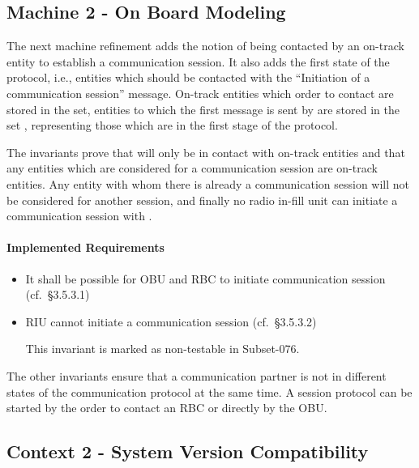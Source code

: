 \documentclass{template/openetcs_article}
\begin{document}
%

\subsection{Machine 2 - On Board Modeling}
\label{sec:machine-2-board}

The next machine refinement adds the notion of being contacted by an on-track
entity to establish a communication session. It also adds the first state of the
protocol, i.e., entities which should be contacted with the ``Initiation of a
communication session'' message. On-track entities which order 
to contact are stored in the  set, entities to which the
first message is sent by  are stored in the set
, representing those which are in the first stage of the
protocol.

The invariants prove that  will only be in contact with
on-track entities and that any entities which are considered for a communication
session are on-track entities. Any entity with whom there is already a
communication session will not be considered for another session, and finally no
radio in-fill unit can initiate a communication session with .

\paragraph{Implemented Requirements}
\label{sec:impl-requ-1}

\begin{itemize}
\item It shall be possible for OBU and RBC to initiate communication session
  (cf.~§3.5.3.1)
\item RIU cannot initiate a communication session (cf.~§3.5.3.2)

This invariant is marked as non-testable in Subset-076.
\end{itemize}

The other invariants ensure that a communication partner is not in different
states of the communication protocol at the same time. A session protocol can be
started by the order to contact an RBC or directly by the OBU.

%

\subsection{Context 2 - System Version Compatibility}
\label{sec:context-2-system}
\end{document}
